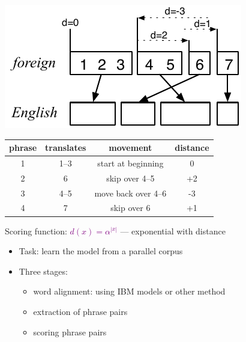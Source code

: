 \documentclass[landscape]{slides}
\newcommand{\maths}[1]{\textcolor{purple}{#1}}
\begin{document}
\begin{center}
\includegraphics[scale=1.7]{reordering-model3.pdf}

{\small \vspace{5mm}
\begin{tabular}{c|c|c|c}
\bf phrase & \bf translates & \bf movement & \bf distance \\ \hline
1 & 1--3 & start at beginning & 0 \\ \hline
2 & 6 &    skip over 4--5 & +2 \\ \hline
3 & 4--5 & move back over 4--6 & -3 \\ \hline
4 & 7 &    skip over 6 & +1 \\ \hline 
\end{tabular}
} \vspace{10mm}

Scoring function:
\maths{$d(x) = \alpha^{|x|}$}
--- exponential with distance
\end{center}


\begin{itemize} \vspace{20mm}
\item Task: learn the model from a parallel corpus \vspace{10mm}
\item Three stages: 
\begin{itemize}
\item word alignment: using IBM models or other method
\item extraction of phrase pairs
\item scoring phrase pairs
\end{itemize}
\end{itemize}

\end{document}
